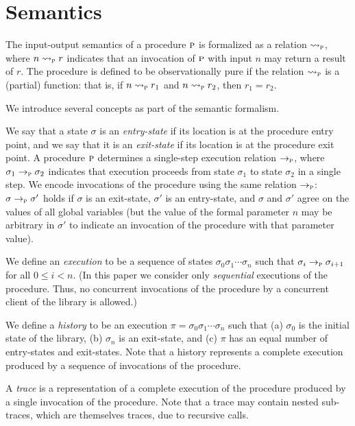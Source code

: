 \newcommand{\iosem}[1]{\rightsquigarrow_{#1}}
\newcommand{\sssem}[1]{\rightarrow_{#1}}

\section{Semantics}

The input-output semantics of a procedure $\textsc{p}$ is formalized as a relation $\iosem{\proc}$, where $n \iosem{\proc} r$ indicates
that an invocation of $\textsc{p}$ with input $n$ may return a result of $r$. The procedure is defined to be observationally
pure if the relation $\iosem{\proc}$ is a (partial) function: that is, if 
$n \iosem{\proc} r_1$ and $n \iosem{\proc} r_2$, then $r_1 = r_2$.

We introduce several concepts as part of the semantic formalism.

We say that a state $\sigma$ is an \emph{entry-state} if its location is at the procedure entry point,
and we say that it is an \emph{exit-state} if its location is at the procedure exit point.
A procedure $\textsc{p}$ determines a single-step execution relation $\sssem{\proc}$, where $\sigma_1 \sssem{\proc} \sigma_2$ indicates
that execution proceeds from state $\sigma_1$ to state $\sigma_2$ in a single step.
We encode invocations of the procedure using the same relation $\sssem{\proc}$: 
$\sigma \sssem{\proc} \sigma'$  holds if $\sigma$ is an exit-state, $\sigma'$ is an entry-state,
and $\sigma$ and $\sigma'$ agree on the values of all global variables (but the value of the formal
parameter $n$ may be arbitrary in $\sigma'$ to indicate an invocation of the procedure with that
parameter value).

We define an \emph{execution} to be a sequence of states $\sigma_0 \sigma_1 \cdots \sigma_n$ such that
$\sigma_i \sssem{\proc} \sigma_{i+1}$ for all $0 \leq i < n$.
(In this paper we consider only \emph{sequential} executions of the procedure. Thus, no concurrent invocations
of the procedure by a concurrent client of the library is allowed.)

We define a \emph{history} to be an execution $\pi = \sigma_0 \sigma_1 \cdots \sigma_n$ such that
(a) $\sigma_0$ is the initial state of the library,
(b) $\sigma_n$ is an exit-state, and
(c) $\pi$ has an equal number of entry-states and exit-states.
Note that a history represents a complete  execution produced by a
sequence of invocations of the procedure.

A \emph{trace} is a representation of a complete execution of the procedure produced by a single
invocation of the procedure. Note that a trace may contain nested sub-traces,
which are themselves traces, due to recursive calls.


